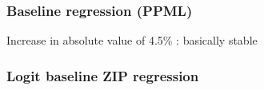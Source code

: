 \documentclass{beamer}
\begin{document}
\begin{frame}[plain]\frametitle{Baseline regression (PPML)}
\begin{figure}[h!]
\begin{center}
\setlength{\fboxrule}{1pt} %
\setlength{\fboxsep}{.1in} %
\end{center}
\end{figure}
Increase in absolute value of 4.5\% : basically stable
\end{frame}

\begin{frame}[plain]\frametitle{Logit baseline ZIP regression}
\begin{figure}[h!]
\begin{center}
\setlength{\fboxrule}{1pt} %
\setlength{\fboxsep}{.1in} %
\end{center}
\end{figure}

\end{frame}
\fi
\end{document}
